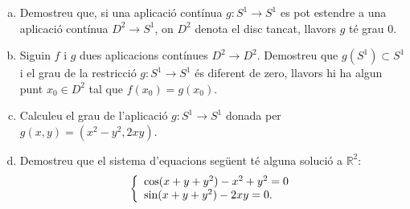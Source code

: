 \documentclass[../main.tex]{subfiles}
\begin{document}
\begin{exercici}
[Exercici 16]\label{exercici2.16} \begin{enumerate}[(a)]
    \item Demostreu que, si una aplicació contínua $g:S^1\rightarrow S^1$ es pot estendre a una aplicació contínua $D^2\rightarrow S^1$, on $D^2$ denota el disc tancat, llavors $g$ té grau 0.
    \item Siguin $f$ i $g$ dues aplicacions contínues $D^2\rightarrow D^2$. Demostreu que $g(S^1)\subset S^1$ i el grau de la restricció $g:S^1\rightarrow S^1$ és diferent de zero, llavors hi ha algun punt $x_0\in D^2$ tal que $f(x_0) = g(x_0)$.
    \item Calculeu el grau de l'aplicació $g:S^1\rightarrow S^1$ donada per $g(x,y) = (x^2-y^2,2xy)$.
    \item Demostreu que el sistema d'equacions següent té alguna solució a $\mathbb{R}^2$:
    \begin{equation}
        \notag
        \left\{
        \begin{array}{ll}
            \cos(x+y+y^2)-x^2+y^2 = 0 \\
            \sin(x+y+y^2)-2xy=0.
        \end{array}
        \right.
    \end{equation}
\end{enumerate}
\end{exercici}
\end{document}
